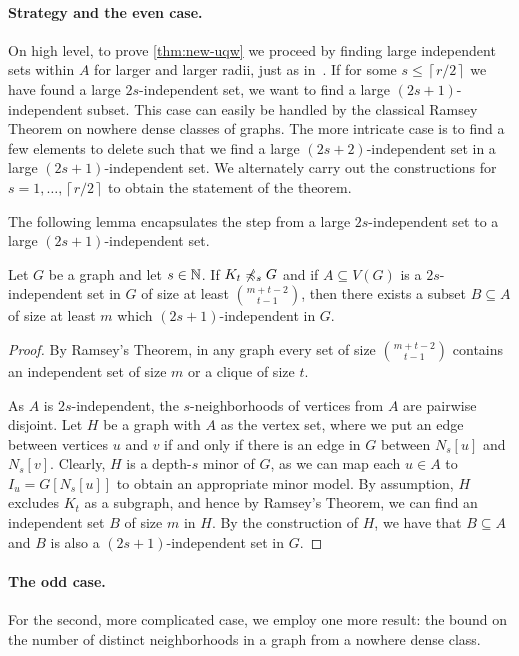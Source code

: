 \paragraph{Strategy and the even case.}
On high level, to prove \cref{thm:new-uqw} we proceed by finding large independent sets within $A$ for larger and larger radii, just as in~\cite{nevsetvril2010first}.
If for some $s\leq \left\lceil r/2\right\rceil$
we have found a large $2s$-independent set, we want to find a large 
$(2s+1)$-independent subset. This case can easily be handled by the classical Ramsey 
Theorem on nowhere dense classes of graphs. The more
intricate case is to find a few elements to delete such that
we find a large $(2s+2)$-independent set in a large $(2s+1)$-independent set. 
We alternately carry out the constructions for $s=1,\ldots, \left\lceil r/2\right\rceil$ to 
obtain the statement of the theorem.

The following lemma encapsulates the step from a large $2s$-independent set to a large $(2s+1)$-independent set.

\begin{lemma}\label{lem:ramsey1}
Let $G$ be a graph and let $s\in \mathbb{N}$. If $K_t\not\preccurlyeq_{s} G$ and 
if $A\subseteq V(G)$ is a $2s$-independent set in $G$ of
size at least $\binom{m+t-2}{t-1}$, then there exists
a subset $B\subseteq A$ of size at least $m$ which $(2s+1)$-independent in $G$. 
\end{lemma}
\begin{proof}
By Ramsey's Theorem, in any graph every set of size $\binom{m+t-2}{t-1}$ contains an
independent set of size $m$ or a clique of size $t$. 

As $A$ is $2s$-independent, the $s$-neighborhoods of vertices from $A$ are pairwise disjoint.
Let $H$ be a graph with $A$ as the vertex set, where we put an edge between vertices $u$ and $v$ if and only if there is an edge in $G$ between $N_s[u]$ and $N_s[v]$.
Clearly, $H$ is a depth-$s$ minor of $G$, as we can map each $u\in A$ to $I_u=G[N_s[u]]$ to obtain an appropriate minor model.
By assumption, 
$H$ excludes $K_t$ as a subgraph, and hence by Ramsey's Theorem,
we can find an independent set $B$ of size $m$ in $H$. 
By the construction of $H$, we have that $B\subseteq A$ and $B$ is also a $(2s+1)$-independent set in $G$. 
\end{proof}

\paragraph{The odd case.}
For the second, more complicated case, 
we employ one more result: the bound on the number of distinct neighborhoods in a graph from a nowhere dense class.

